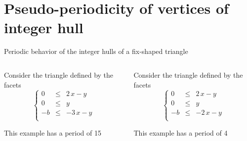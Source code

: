 \section{Pseudo-periodicity of vertices of integer hull}

\begin{frame}{Periodic behavior of the integer hulls of a fix-shaped triangle}
	\begin{block}{}
		\begin{columns}
			\begin{column}{0.5\textwidth}
				Consider the triangle defined by the facets
				\begin{equation}
					\left\{   \begin{array}{crl}
						0 & \le & 2\,x -y \\
						0 & \le & y \\
						-b & \le & -3\,x -y \\
					\end{array}
					\right.
				\end{equation}
				\begin{center}
					
				
				
				This example has a period of 15
			\end{center}
			\end{column}
		\begin{column}{0.5\textwidth}
			Consider the triangle defined by the facets
			\begin{equation}
				\left\{   \begin{array}{crl}
					0 & \le & 2\,x - y  \\
					0 & \le & y \\
					-b & \le & -2\,x -y\\
				\end{array}
				\right.
			\end{equation}

					\begin{center}
						
	
				This example has a period of 4
			\end{center}
		\end{column}
		\end{columns}
		
	\end{block}
\end{frame}
